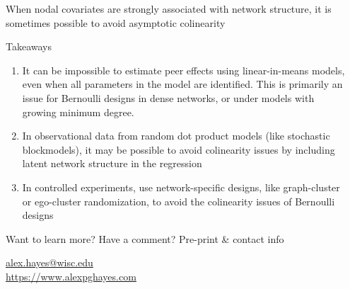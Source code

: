 \documentclass[final]{beamer}
\newlength{\sepwidth}
\newlength{\colwidth}
\newcommand{\separatorcolumn}{\begin{column}{\sepwidth}\end{column}}
\begin{document}
\begin{frame}[t]
\begin{columns}[t]
\begin{column}{\colwidth}
\begin{block}{When nodal covariates are strongly associated with network structure, it is sometimes possible to avoid asymptotic colinearity}
            \end{block}

            \begin{block}{Takeaways}
                \begin{enumerate}
                    \item It can be impossible to estimate peer effects using linear-in-means models, even when all parameters in the model are identified. This is primarily an issue for Bernoulli designs in dense networks, or under models with growing minimum degree.
                    \item In observational data from random dot product models (like stochastic blockmodels), it may be possible to avoid colinearity issues by including latent network structure in the regression
                    \item In controlled experiments, use network-specific designs, like graph-cluster or ego-cluster randomization, to avoid the colinearity issues of Bernoulli designs
                \end{enumerate}
            \end{block}

            \begin{block}{Want to learn more? Have a comment? Pre-print \& contact info}
                \nocite{hayes2024c}
                \printbibliography
                \begin{center}
                    \url{alex.hayes@wisc.edu} \\
                    \url{https://www.alexpghayes.com}
                \end{center}
            \end{block}


        \end{column}

        \separatorcolumn
    \end{columns}
\end{frame}



\end{document}
